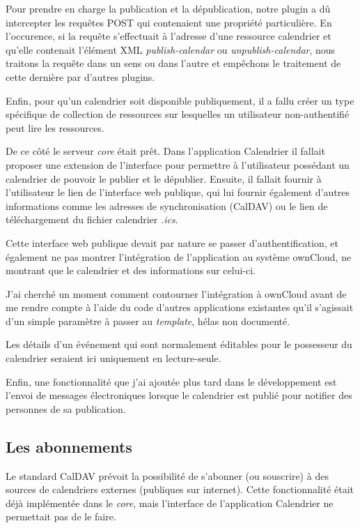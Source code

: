 \documentclass[10pt,a4paper, twoside]{report}
\begin{document}
	Pour prendre en charge la publication et la dépublication, notre plugin a dû intercepter les requêtes POST qui contenaient une propriété particulière.
	En l'occurence, si la requête s'effectuait à l'adresse d'une ressource calendrier et qu'elle contenait l'élément XML \textit{publish-calendar} ou \textit{unpublish-calendar}, nous traitons la requête dans un sens ou dans l'autre et empêchons le traitement de cette dernière par d'autres plugins.
	
	Enfin, pour qu'un calendrier soit disponible publiquement, il a fallu créer un type spécifique de collection de ressources sur lesquelles un utilisateur non-authentifié peut lire les ressources.
	
	De ce côté le serveur \textit{core} était prêt. Dans l'application Calendrier il fallait proposer une extension de l'interface pour permettre à l'utilisateur possédant un calendrier de pouvoir le publier et le dépublier. Ensuite, il fallait fournir à l'utilisateur le lien de l'interface web publique, qui lui fournir également d'autres informations comme les adresses de synchronisation (CalDAV) ou le lien de téléchargement du fichier calendrier \textit{.ics}.
	
	Cette interface web publique devait par nature se passer d'authentification, et également ne pas montrer l'intégration de l'application au système ownCloud, ne montrant que le calendrier et des informations sur celui-ci.
	
	J'ai cherché un moment comment contourner l'intégration à ownCloud avant de me rendre compte à l'aide du code d'autres applications existantes qu'il s'agissait d'un simple paramètre à passer au \textit{template}, hélas non documenté.
	
	Les détails d'un événement qui sont normalement éditables pour le possesseur du calendrier seraient ici uniquement en lecture-seule.
	
	Enfin, une fonctionnalité que j'ai ajoutée plus tard dans le développement est l'envoi de messages électroniques lorsque le calendrier est publié pour notifier des personnes de sa publication.
	
	\subsection{Les abonnements}
	Le standard CalDAV prévoit la possibilité de s'abonner (ou souscrire) à des sources de calendriers externes (publiques sur internet). Cette fonctionnalité était déjà implémentée dans le \textit{core}, mais l'interface de l'application Calendrier ne permettait pas de le faire. 
	
\end{document}
